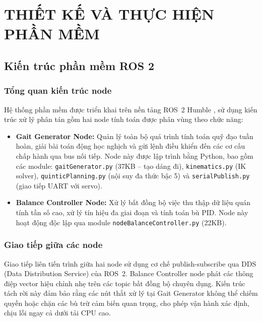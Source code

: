 \chapter{THIẾT KẾ VÀ THỰC HIỆN PHẦN MỀM}

\section{Kiến trúc phần mềm ROS 2}

\subsection{Tổng quan kiến trúc node}

Hệ thống phần mềm được triển khai trên nền tảng ROS~2 Humble \cite{ros2docs}, sử dụng kiến trúc xử lý phân tán gồm hai node tính toán được phân vùng theo chức năng:

\begin{itemize}
    \item \textbf{Gait Generator Node:} Quản lý toàn bộ quá trình tính toán quỹ đạo tuần hoàn, giải bài toán động học nghịch và gửi lệnh điều khiển đến các cơ cấu chấp hành qua bus nối tiếp. Node này được lập trình bằng Python, bao gồm các module: \texttt{gaitGenerator.py} (37KB -- tạo dáng đi), \texttt{kinematics.py} (IK solver), \texttt{quinticPlanning.py} (nội suy đa thức bậc 5) và \texttt{serialPublish.py} (giao tiếp UART với servo).
    
    \item \textbf{Balance Controller Node:} Xử lý bất đồng bộ việc thu thập dữ liệu quán tính tần số cao, xử lý tín hiệu đa giai đoạn và tính toán bù PID. Node này hoạt động độc lập qua module \texttt{nodeBalanceController.py} (22KB).
\end{itemize}

\subsection{Giao tiếp giữa các node}

Giao tiếp liên tiến trình giữa hai node sử dụng cơ chế publish-subscribe qua DDS (Data Distribution Service) của ROS~2. Balance Controller node phát các thông điệp vector hiệu chỉnh nhẹ trên các topic bất đồng bộ chuyên dụng. Kiến trúc tách rời này đảm bảo rằng các nút thắt xử lý tại Gait Generator không thể chiếm quyền hoặc chặn các bù trừ cảm biến quan trọng, cho phép vận hành xác định, chịu lỗi ngay cả dưới tải CPU cao.

